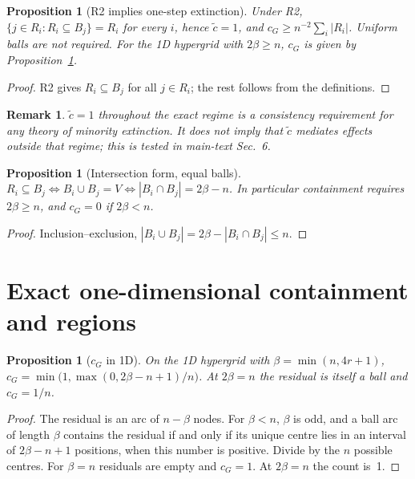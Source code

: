 \documentclass[pdflatex,sn-mathphys-num]{sn-jnl}
\theoremstyle{thmstyleone}%
\newtheorem{proposition}[theorem]{Proposition}
\theoremstyle{thmstylethree}%
\theoremstyle{thmstyletwo}%
\newtheorem{remark}{Remark}[theorem]
\newcommand{\ctil}{\tilde{c}}
\newcommand{\cG}{c_G}
\begin{document}
\begin{proposition}[R2 implies one-step extinction]
\label{prop:D3}
Under R2, $\{j\in R_i:R_i\subseteq B_j\}=R_i$ for every $i$, hence
$\ctil=1$, and $\cG\ge n^{-2}\sum_i|R_i|$. Uniform balls are not required.
For the 1D hypergrid with $2\beta\ge n$, $\cG$ is given by
Proposition~\ref{prop:E1}.
\end{proposition}
\begin{proof}
R2 gives $R_i\subseteq B_j$ for all $j\in R_i$; the rest follows from the
definitions.
\end{proof}
\begin{remark}
\label{rem:D3.1}
$\ctil=1$ throughout the exact regime is a consistency requirement for
any theory of minority extinction. It does not imply that $\ctil$
mediates effects outside that regime; this is tested in main-text
Sec.~6.
\end{remark}

\begin{proposition}[Intersection form, equal balls]
\label{prop:D4}
$R_i\subseteq B_j\iff B_i\cup B_j=V\iff|B_i\cap B_j|=2\beta-n$. In
particular containment requires $2\beta\ge n$, and $\cG=0$ if $2\beta<n$.
\end{proposition}
\begin{proof}
Inclusion--exclusion, $|B_i\cup B_j|=2\beta-|B_i\cap B_j|\le n$.
\end{proof}

\section{Exact one-dimensional containment and regions}
\label{sec:E}

\begin{proposition}[$\cG$ in 1D]
\label{prop:E1}
On the 1D hypergrid with $\beta=\min(n,4r+1)$,
$\cG=\min\big(1,\max(0,2\beta-n+1)/n\big)$. At $2\beta=n$ the residual is
itself a ball and $\cG=1/n$.
\end{proposition}
\begin{proof}
The residual is an arc of $n-\beta$ nodes. For $\beta<n$, $\beta$ is odd,
and a ball arc of length $\beta$ contains the residual if and only if its
unique centre lies in an interval of $2\beta-n+1$ positions, when this
number is positive. Divide by the $n$ possible centres. For $\beta=n$
residuals are empty and $\cG=1$. At $2\beta=n$ the count is~1.
\end{proof}
\end{document}

